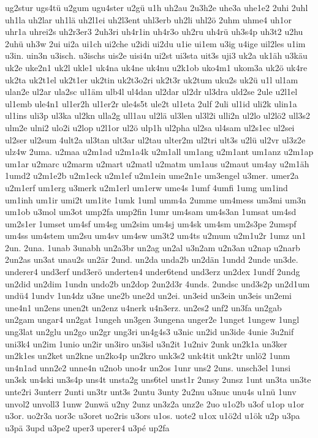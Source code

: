 {ug2stur
ugs4tü
u2gum
ugu4ster
u2gü
u1h
uh2au
2u3h2e
uhe3a
uhe1e2
2uhi
2uhl
uh1la
uh2lar
uh1lä
uh2l1ei
uh2l3ent
uhl3erb
uh2li
uhl2ö
2uhm
uhme4
uh1or
uhr1a
uhrei2s
uh2r3er3
2uh3ri
uh4r1in
uh4r3o
uh2ru
uh4rü
uh3s4p
uh3t2
u2hu
2uhü
uh3w
2ui
ui2a
ui1ch
ui2che
u2idi
ui2du
u1ie
ui1em
u3ig
u4ige
uil2les
u1im
u3in.
uin3n
u3isch.
u3ischs
uis2e
uisi4n
ui2st
ui3sta
uit3s
uji3
uk2a
uk1äh
u3käu
uk2e
uke2n1
uk2l
ukle1
uk4na
uk4ne
uk4nu
u2k1ob
uko4m1
ukom3a
uk2ö
uk4re
uk2ta
uk2t1el
uk2t1er
uk2tin
uk2t3o2ri
uk2t3r
uk2tum
uku2s
uk2ü
u1l
ul1am
ulan2e
ul2ar
ula2sc
ul1äm
ulb4l
ul4dan
ul2dar
ul2dr
ul3dra
uld2se
2ule
u2l1el
ul1emb
ule4n1
ul1er2h
ul1er2r
ule4s5t
ule2t
ul1eta
2ulf
2uli
ul1id
uli2k
ulin1a
ul1ins
uli3p
ul3ka
ul2kn
ulla2g
ull1au
ul2lä
ul3len
ul3l2i
ulli2n
ul2lo
ul2lö2
ull3s2
ulm2e
ulni2
ulo2i
u2lop
u2l1or
ul2ö
ulp1h
ul2pha
ul2sa
ul4sam
ul2s1ec
ul2sei
ul2ser
ul2sum
4ult2a
ul3tan
ult3ar
ul2tau
ulter2m
ul2tri
ult3s
u2lü
ul2vr
ul3z2e
ulz4w
2uma.
u2maa
u2m1ad
u2m1a4k
u2m1all
um1ang
u2m1ant
um1anz
u2m1ap
um1ar
u2marc
u2marm
u2mart
u2matl
u2matm
um1aus
u2maut
um4ay
u2m1äh
1umd2
u2m1e2b
u2m1eck
u2m1ef
u2m1ein
ume2n1e
um3engel
u3mer.
umer2a
u2m1erf
um1erg
u3merk
u2m1erl
um1erw
ume4s
1umf
4umfi
1umg
um1ind
um1inh
um1ir
umi2t
um1ite
1umk
1uml
umm4a
2umme
um4mess
um3mi
um3n
um1ob
u3mol
um3ot
ump2fa
ump2fin
1umr
um4sam
um4s3an
1umsat
um4sd
um2s1er
1umset
um4sf
um4sg
um2sim
um4sj
um4sk
um4sm
um2s3pe
2umspf
um4ss
um4stem
um2su
um4sv
um4sw
um3t2
um4ts
u2mum
u2m1u2r
1umz
un1
2un.
2una.
1unab
3unabh
un2a3br
un2ag
un2al
u3n2am
u2n3an
u2nap
u2narb
2un2as
un3at
unau2s
un2är
2und.
un2da
unda2b
un2dän
1undd
2unde
un3de.
underer4
und3erf
und3erö
underten4
under6tend
und3erz
un2dex
1undf
2undg
un2did
un2dim
1undn
undo2b
un2dop
2un2d3r
4unds.
2undsc
und3s2p
un2d1um
undü4
1undv
1un4dz
u3ne
une2b
une2d
un2ei.
un3eid
un3ein
un3eis
un2emi
une4n1
un2ens
unen2t
un2enz
u4nerk
u4n3erz.
un2es2
unf2
un3fa
un2gab
un2gam
ungar4
un2gat
1ungeh
un3gen
3ungena
unger2e
1unget
1ungew
1ungl
ung3lat
un2glu
un2go
un2gr
ung3ri
un4g4s3
u3nic
un2id
un3ide
4unie
3u2nif
uni3k4
un2im
1unio
un2ir
un3iro
un3isl
u3n2it
1u2niv
2unk
un2k1a
un3ker
un2k1es
un2ket
un2kne
un2ko4p
un2kro
unk3s2
unk4tit
unk2tr
unlö2
1unm
un4n1ad
unn2e2
unne4n
u2nob
uno4r
un2os
1unr
uns2
2uns.
unsch3el
1unsi
un3sk
un4ski
un3s4p
uns4t
unsta2g
uns6tel
unst1r
2unsy
2unsz
1unt
un3ta
un3te
unte2ri
3unterr
2unti
un3tr
unt3s
2untu
3unty
2u2nu
u3nuc
unu4s
u1nü
1unv
unvol2
unvoll3
1unw
2unwä
u2ny
2unz
un3z2a
unz2e
2uo
u1o2b
u3of
u1op
u1or
u3or.
uo2r3a
uor3c
u3oret
uo2ris
u3ors
u1os.
uote2
u1ox
u1ö2d
u1ök
u2p
u3pa
u3pä
3upd
u3pe2
uper3
uperer4
u3pé
up2fa
}
